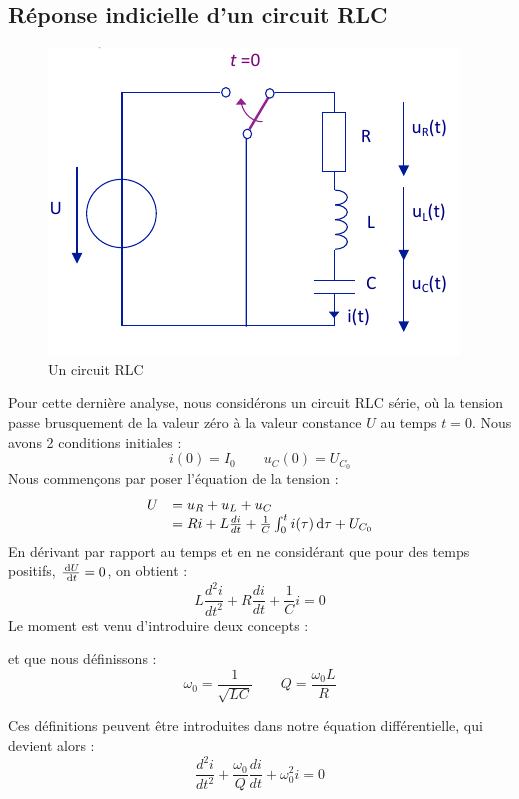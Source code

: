 \documentclass[12pt,a4paper]{article}
\begin{document}
\subsection[Circuit RLC]{Réponse indicielle d'un circuit RLC}
\begin{figure}[!h]
	\centering
	\includegraphics[scale=0.5]{images/circuit_rlc_saut}
	\caption{Un circuit RLC}
	\label{fig: circuit rlc saut}
\end{figure}
Pour cette dernière analyse, nous considérons un circuit RLC série, où la tension passe brusquement de la valeur zéro à la valeur constance $U$ au temps $t=0$. Nous avons 2 conditions initiales :
\[i(0) = I_0 \qquad u_C(0) = U_{C_0}\]
Nous commençons par poser l'équation de la tension :
\[\begin{array}{ll}
U & = u_R + u_L + u_C\\
  & = Ri + L\frac{di}{dt} + \frac{1}{C}\int_0^t i(\tau) \, \mathrm d \tau + U_{C_0}
\end{array}\]
En dérivant par rapport au temps et en ne considérant que pour des temps positifs, $\frac{\, \mathrm d U}{\, \mathrm d t} = 0$, on obtient :
\[L\frac{d^2 i}{dt^2} + R\frac{di}{dt} + \frac{1}{C}i = 0\]
Le moment est venu d'introduire deux concepts :
\begin{boite}
	 et  que nous définissons :
	\begin{equation}
		\omega_0 = \frac{1}{\sqrt{LC}} \qquad Q = \frac{\omega_0 L}{R}
	\end{equation}
\end{boite}
Ces définitions peuvent être introduites dans notre équation différentielle, qui devient alors :
\begin{equation}
	\frac{d^2 i}{dt^2} + \frac{\omega_0}{Q} \frac{di}{dt} + \omega_0^2 i = 0
\end{equation}
\end{document}
